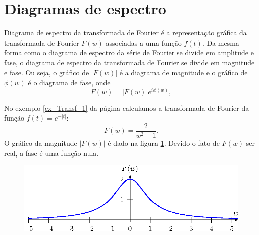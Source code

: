 \section{Diagramas de espectro}
Diagrama de espectro da transformada de Fourier é a representação gráfica da transformada de Fourier $F(w)$ associadas a uma função $f(t)$. Da mesma forma como o diagrama de espectro da série de Fourier se divide em amplitude e fase, o diagrama de espectro da transformada de Fourier se divide em magnitude e fase. Ou seja, o gráfico de $|F(w)|$ é a diagrama de magnitude e o gráfico de $\phi(w)$ é o diagrama de fase, onde
\begin{equation}
F(w)=|F(w)|e^{i\phi(w)},
\end{equation}
\begin{ex}No exemplo \ref{ex_Transf_1} da página \pageref{ex_Transf_1} calculamos a transformada de Fourier da função $f(t)=e^{-|t|}$:
\begin{equation}
F(w)=\frac{2}{w^2+1}.
\end{equation}
O gráfico da magnitude $|F(w)|$ é dado na figura \ref{diag_espec_trans_1}. Devido o fato de $F(w)$ ser real, a fase é uma função nula.
\begin{figure}[!ht]
\begin{center}
\includegraphics{cap_diagramas_espectro_transformada/pics/figura_1}\end{center}
\caption{\label{diag_espec_trans_1}}
\end{figure}
\end{ex}
